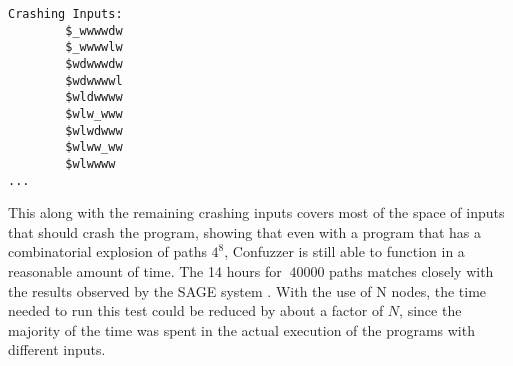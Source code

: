 \begin{verbatim}
Crashing Inputs:
        $_wwwwdw
        $_wwwwlw
        $wdwwwdw
        $wdwwwwl
        $wldwwww
        $wlw_www
        $wlwdwww
        $wlww_ww
        $wlwwww
...
\end{verbatim}

This along with the remaining crashing inputs covers most of the space of inputs
that should crash the program, showing that even with a program that has a
combinatorial explosion of paths $4^8$, Confuzzer is still able to function in a
reasonable amount of time. The 14 hours for $~40000$ paths matches closely with
the results observed by the SAGE system \cite{sage}. With the use of N nodes,
the time needed to run this test could be reduced by about a factor of $N$,
since the majority of the time was spent in the actual execution of the programs
with different inputs.
